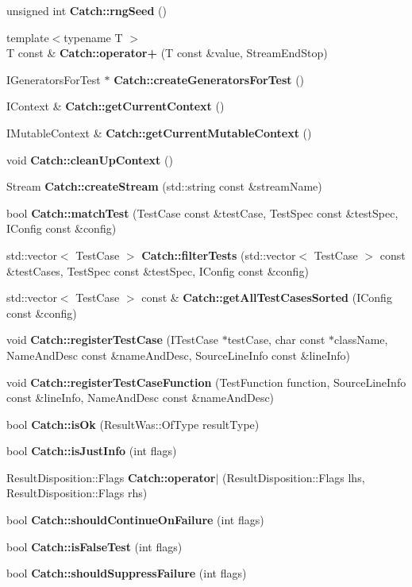 \begin{DoxyCompactItemize}
unsigned int \textbf{ Catch\+::rng\+Seed} ()
\item 
{\footnotesize template$<$typename T $>$ }\\T const  \& \textbf{ Catch\+::operator+} (T const \&value, Stream\+End\+Stop)
\item 
I\+Generators\+For\+Test $\ast$ \textbf{ Catch\+::create\+Generators\+For\+Test} ()
\item 
I\+Context \& \textbf{ Catch\+::get\+Current\+Context} ()
\item 
I\+Mutable\+Context \& \textbf{ Catch\+::get\+Current\+Mutable\+Context} ()
\item 
void \textbf{ Catch\+::clean\+Up\+Context} ()
\item 
Stream \textbf{ Catch\+::create\+Stream} (std\+::string const \&stream\+Name)
\item 
bool \textbf{ Catch\+::match\+Test} (Test\+Case const \&test\+Case, Test\+Spec const \&test\+Spec, I\+Config const \&config)
\item 
std\+::vector$<$ Test\+Case $>$ \textbf{ Catch\+::filter\+Tests} (std\+::vector$<$ Test\+Case $>$ const \&test\+Cases, Test\+Spec const \&test\+Spec, I\+Config const \&config)
\item 
std\+::vector$<$ Test\+Case $>$ const  \& \textbf{ Catch\+::get\+All\+Test\+Cases\+Sorted} (I\+Config const \&config)
\item 
void \textbf{ Catch\+::register\+Test\+Case} (I\+Test\+Case $\ast$test\+Case, char const $\ast$class\+Name, Name\+And\+Desc const \&name\+And\+Desc, Source\+Line\+Info const \&line\+Info)
\item 
void \textbf{ Catch\+::register\+Test\+Case\+Function} (Test\+Function function, Source\+Line\+Info const \&line\+Info, Name\+And\+Desc const \&name\+And\+Desc)
\item 
bool \textbf{ Catch\+::is\+Ok} (Result\+Was\+::\+Of\+Type result\+Type)
\item 
bool \textbf{ Catch\+::is\+Just\+Info} (int flags)
\item 
Result\+Disposition\+::\+Flags \textbf{ Catch\+::operator$\vert$} (Result\+Disposition\+::\+Flags lhs, Result\+Disposition\+::\+Flags rhs)
\item 
bool \textbf{ Catch\+::should\+Continue\+On\+Failure} (int flags)
\item 
bool \textbf{ Catch\+::is\+False\+Test} (int flags)
\item 
bool \textbf{ Catch\+::should\+Suppress\+Failure} (int flags)
\item 

\end{DoxyCompactItemize}
